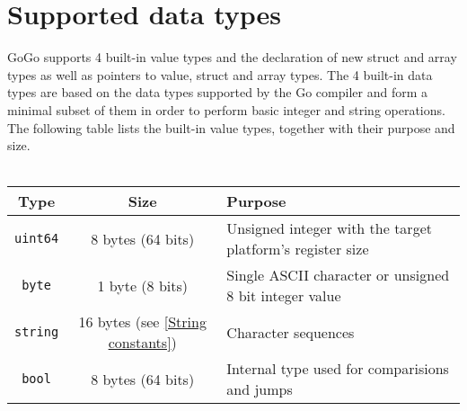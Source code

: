 \documentclass[a4paper]{scrreprt}
\begin{document}
    \section{Supported data types}
      GoGo supports 4 built-in value types and the declaration of new struct and array types as well as pointers to value, struct and array types. The 4 built-in data types are based on the data types supported by the Go compiler and form a minimal subset of them in order to perform basic integer and string operations. The following table lists the built-in value types, together with their purpose and size.\\ \\
      \begin{tabular}{|c|c|l|}
        \hline
        \textbf{Type} & \textbf{Size} & \textbf{Purpose}\\ \hline
        \texttt{uint64} & 8 bytes (64 bits) & Unsigned integer with the target platform's register size\\ \hline
        \texttt{byte} & 1 byte (8 bits) & Single ASCII character or unsigned 8 bit integer value\\ \hline
        \texttt{string} & 16 bytes (see \ref{String constants}) & Character sequences\\ \hline
        \texttt{bool} & 8 bytes (64 bits) & Internal type used for comparisions and jumps\\ \hline
      \end{tabular}
		
\end{document}
